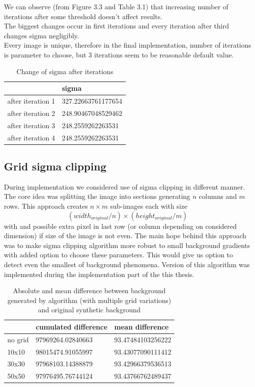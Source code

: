 \documentclass[12pt, a4paper, oneside]{book}
\begin{document}
We can observe (from Figure 3.3 and Table 3.1) that increasing number of iterations after some threshold doesn't affect results.\\
The biggest changes occur in first iterations and every iteration after third changes sigma negligibly.\\
Every image is unique, therefore in the final implementation, number of iterations is parameter to choose, but 3 iterations seem to be reasonable default value.

\begin{table}[]
    \centering
\begin{tabular}{|l|l|}
\hline
                  & sigma               \\ \hline
after iteration 1 & 327.22663761177654 \\ \hline
after iteration 2 & 248.90467048529462 \\ \hline
after iteration 3 & 248.2559262263531  \\ \hline
after iteration 4 & 248.2559262263531 \\ \hline
\end{tabular}
    \caption{Change of sigma after iterations}
    \label{tab:sigma}
\end{table}

\subsection{Grid sigma clipping}
During implementation we considered use of sigma clipping in different manner.
The core idea was splitting the image into sections generating $n$ columns and $m$ rows.
This approach creates $n \times m$ sub-images each with size
\begin{equation}
    (width_{original}/n) \times (height_{original}/m)
\end{equation}
with and possible extra pixel in last row (or column depending on considered dimension) if size of the image is not even.
The main hope behind this approach was to make sigma clipping algorithm more robust to small background gradients with added option to choose these parameters.
This would give us option to detect even the smallest of background phenomena.
Version of this algorithm was implemented during the implementation part of the this thesis.


\clearpage
\begin{table}[]
    \centering
\begin{tabular}{|l|l|l|}
\hline
                  & cumulated difference & mean difference\\ \hline
    no grid & 97969264.02840663 & 93.47484103256222 \\ \hline
    10x10 & 98015474.91055997 & 93.43077090111412 \\ \hline
    30x30 & 97968103.14388879 & 93.42966379536513  \\ \hline
    50x50 & 97976495.76744124 & 93.43766762489437 \\ \hline
\end{tabular}
    \caption{Absolute and mean difference between background generated by algorithm (with multiple grid variations) and original synthetic background}
    \label{tab:grid_results}
\end{table}
\end{document}
